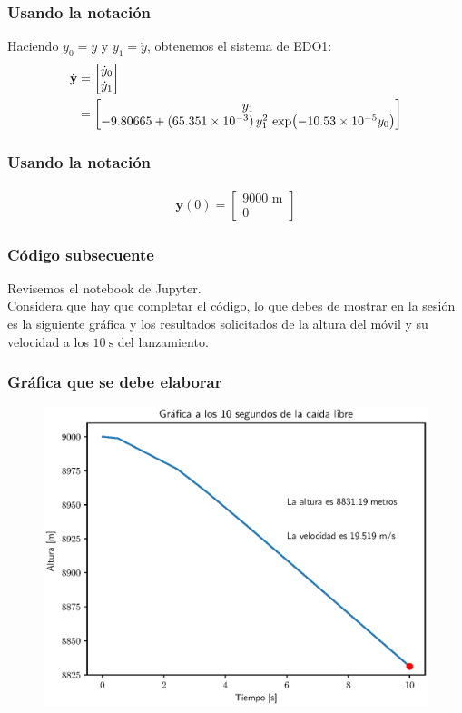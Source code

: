 \documentclass[12pt]{beamer}
\begin{document}
\begin{frame}
\frametitle{Usando la notación}
Haciendo $y_{0} = y$ y $y_{1} = \dot{y}$, obtenemos el sistema de EDO1:
\pause
\begin{align*}
\mathbf{\dot{y}} &= \begin{bmatrix}
\dot{y}_{0} \\
\dot{y}_{1}
\end{bmatrix} \\
&= \begin{bmatrix}
y_{1} \\
-9.80665 + (\num{65.351d-3}) \, y_{1}^{2} \, \exp(\num{-10.53d-5} y_{0})
\end{bmatrix}
\end{align*}
\end{frame}
\begin{frame}
\frametitle{Usando la notación}
\begin{align*}
\mathbf{y}(0) = 
\begin{bmatrix}
9000 \mbox{ m} \\
0
\end{bmatrix}
\end{align*}
\end{frame}
\begin{frame}
\frametitle{Código subsecuente}
Revisemos el notebook de Jupyter.
\\
\bigskip
\pause
Considera que hay que completar el código, lo que debes de mostrar en la sesión es la siguiente gráfica y los resultados solicitados de la altura del móvil y su velocidad a los $\SI{10}{\second}$ del lanzamiento.
\end{frame}
\begin{frame}
\frametitle{Gráfica que se debe elaborar}
\begin{figure}
    \centering
    \includegraphics[scale=0.55]{Imagenes/Ejercicio_RKAdaptativo_01.eps}
\end{figure}
\end{frame}
\end{document}
